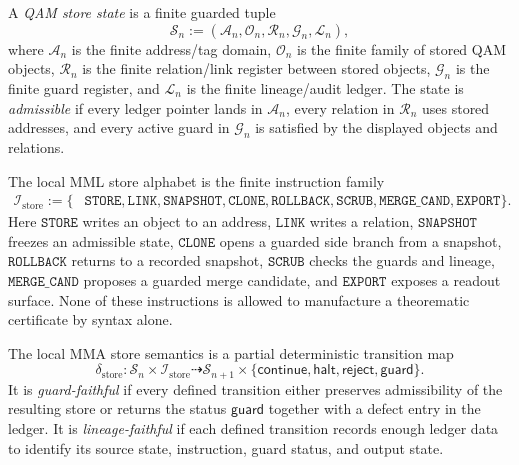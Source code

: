 \begin{definition}\label{def:qam-store-state}
A \emph{QAM store state} is a finite guarded tuple
\[
  \mathcal S_n
  :=
  (\mathcal A_n,\mathcal O_n,\mathcal R_n,\mathcal G_n,\mathcal L_n),
\]
where \(\mathcal A_n\) is the finite address/tag domain, \(\mathcal O_n\) is the finite family of stored QAM objects, \(\mathcal R_n\) is the finite relation/link register between stored objects, \(\mathcal G_n\) is the finite guard register, and \(\mathcal L_n\) is the finite lineage/audit ledger. The state is \emph{admissible} if every ledger pointer lands in \(\mathcal A_n\), every relation in \(\mathcal R_n\) uses stored addresses, and every active guard in \(\mathcal G_n\) is satisfied by the displayed objects and relations.
\end{definition}

\begin{definition}\label{def:mml-store-instructions}
The local MML store alphabet is the finite instruction family
\[
\begin{split}
  \mathcal I_{\mathrm{store}}
  :=\{&\texttt{STORE},\texttt{LINK},\texttt{SNAPSHOT},\texttt{CLONE},\texttt{ROLLBACK},\texttt{SCRUB},\texttt{MERGE\_CAND},\texttt{EXPORT}\}.
\end{split}
\]
Here \(\texttt{STORE}\) writes an object to an address, \(\texttt{LINK}\) writes a relation, \(\texttt{SNAPSHOT}\) freezes an admissible state, \(\texttt{CLONE}\) opens a guarded side branch from a snapshot, \(\texttt{ROLLBACK}\) returns to a recorded snapshot, \(\texttt{SCRUB}\) checks the guards and lineage, \(\texttt{MERGE\_CAND}\) proposes a guarded merge candidate, and \(\texttt{EXPORT}\) exposes a readout surface. None of these instructions is allowed to manufacture a theorematic certificate by syntax alone.
\end{definition}

\begin{definition}\label{def:mma-store-transition}
The local MMA store semantics is a partial deterministic transition map
\[
  \delta_{\mathrm{store}}
  :
  \mathcal S_n\times\mathcal I_{\mathrm{store}}
  \dashrightarrow
  \mathcal S_{n+1}\times
  \{\mathsf{continue},\mathsf{halt},\mathsf{reject},\mathsf{guard}\}.
\]
It is \emph{guard-faithful} if every defined transition either preserves admissibility of the resulting store or returns the status \(\mathsf{guard}\) together with a defect entry in the ledger. It is \emph{lineage-faithful} if each defined transition records enough ledger data to identify its source state, instruction, guard status, and output state.
\end{definition}

